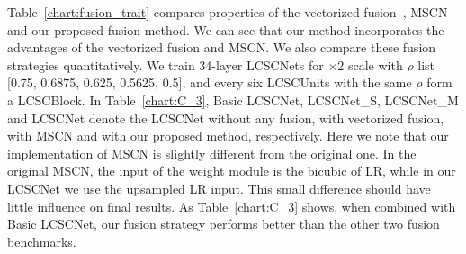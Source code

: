 \documentclass[journal]{IEEEtran}
\begin{document}
Table~\ref{chart:fusion_trait} compares properties of the vectorized fusion~\cite{kim2016deeply}, MSCN~\cite{liu2016learning} and our proposed fusion method. We can see that our method incorporates the advantages of the vectorized fusion and MSCN. We also compare these fusion strategies quantitatively. We train 34-layer LCSCNets for $\times$2 scale with $\rho$ list [0.75, 0.6875, 0.625, 0.5625, 0.5], and every six LCSCUnits with the same $\rho$ form a LCSCBlock. In Table~\ref{chart:C_3}, Basic LCSCNet, LCSCNet\_S, LCSCNet\_M and LCSCNet denote the LCSCNet without any fusion, with vectorized fusion, with MSCN and with our proposed method, respectively. Here we note that our implementation of MSCN is slightly different from the original one. In the original MSCN, the input of the weight module is the bicubic of LR, while in our LCSCNet we use the upsampled LR input. This small difference should have little influence on final results. As Table~\ref{chart:C_3} shows, when combined with Basic LCSCNet, our fusion strategy performs better than the other two fusion benchmarks. 

\begin{table}[htbp]
\centering
{}
\end{table}
\end{document}
